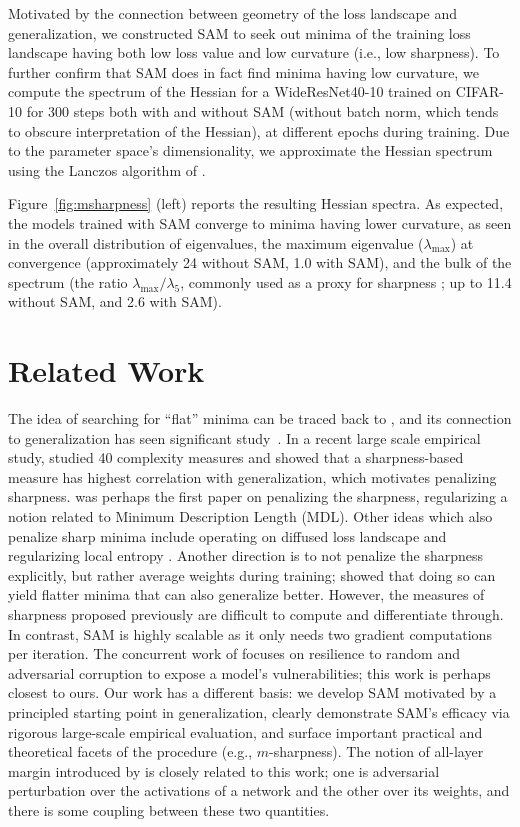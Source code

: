 \documentclass{article} %
\begin{document}
Motivated by the connection between geometry of the loss landscape and generalization, we constructed SAM to seek out minima of the training loss landscape having both low loss value and low curvature (i.e., low sharpness).  To further confirm that SAM does in fact find minima having low curvature, we compute the spectrum of the Hessian for a WideResNet40-10 trained on CIFAR-10 for 300 steps both with and without SAM (without batch norm, which tends to obscure interpretation of the Hessian), at different epochs during training.  Due to the parameter space's dimensionality, we approximate the Hessian spectrum using the Lanczos algorithm of \cite{2019arXiv190110159G}.

Figure~\ref{fig:msharpness} (left) reports the resulting Hessian spectra.  As expected, the models trained with SAM converge to minima having lower curvature, as seen in the overall distribution of eigenvalues, the maximum eigenvalue ($\lambda_{\max}$) at convergence (approximately 24 without SAM, 1.0 with SAM), and the bulk of the spectrum (the ratio $\lambda_{\max} / \lambda_5$, commonly used as a proxy for sharpness \citep{2020arXiv200209572J}; up to 11.4 without SAM, and 2.6 with SAM).


\section{Related Work}\label{sec:related}
The idea of searching for ``flat'' minima can be traced back to \cite{hochreiter1995simplifying}, and its connection to generalization has seen significant study~\citep{keshar,dziugaite2017computing,neyshabur2017exploring,dinh2017sharp}. In a recent large scale empirical study, \cite{jiang2019fantastic} studied 40 complexity measures and showed that a sharpness-based measure has highest correlation with generalization, which motivates penalizing sharpness. \cite{hochreiter1997flat} was perhaps the first paper on penalizing the sharpness, regularizing a notion related to Minimum Description Length (MDL). Other ideas which also penalize sharp minima include operating on diffused loss landscape \citep{Mobahi2016} and regularizing local entropy \citep{2016arXiv161101838C}. Another direction is to not penalize the sharpness explicitly, but rather average weights during training; \cite{swa} showed that doing so can yield flatter minima that can also generalize better. However, the measures of sharpness proposed previously are difficult to compute and differentiate through. In contrast, SAM is highly scalable as it only needs two gradient computations per iteration. The concurrent work of \cite{2020arXiv200605620S} focuses on resilience to random and adversarial corruption to expose a model's vulnerabilities; this work is perhaps closest to ours.  Our work has a different basis: we develop SAM motivated by a principled starting point in generalization, clearly demonstrate SAM's efficacy via rigorous large-scale empirical evaluation, and surface important practical and theoretical facets of the procedure (e.g., $m$-sharpness). The notion of all-layer margin introduced by \cite{Wei2020Improved} is closely related to this work; one is adversarial perturbation over the activations of a network and the other over its weights, and there is some coupling between these two quantities.
\end{document}
